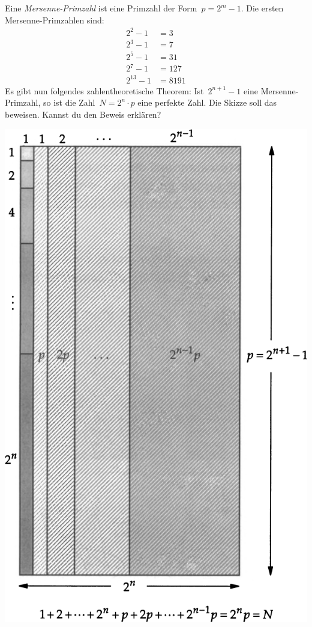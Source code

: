 \documentclass{../zirkelblatt}
\begin{document}
Eine \emph{Mersenne-Primzahl} ist eine Primzahl der Form~$p = 2^m-1$. Die ersten
Mersenne-Primzahlen sind:
\begin{align*}
  2^2 - 1 &= 3 \\
  2^3 - 1 &= 7 \\
  2^5 - 1 &= 31 \\
  2^7 - 1 &= 127 \\
  2^{13} - 1 &= 8191
\end{align*}
Es gibt nun folgendes zahlentheoretische Theorem: Ist~$2^{n+1}-1$ eine
Mersenne-Primzahl, so ist die Zahl~$N = 2^n \cdot p$ eine perfekte Zahl. Die
Skizze soll das beweisen. Kannst du den Beweis erklären?
\begin{center}
\includegraphics[scale=0.5]{mersenne-perfekt}
\end{center}
\end{document}

